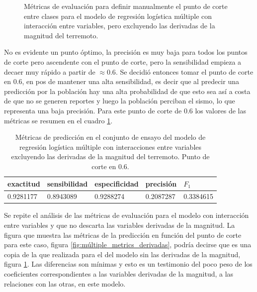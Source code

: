 \documentclass[a4paper]{report}
\begin{document}
\begin{figure}[!ht]
	\centering
	
	\vspace{-0.8cm}
	\caption{Métricas de evaluación para definir manualmente el punto de corte entre clases para el modelo de regresión logística múltiple con interacción entre variables, pero excluyendo las derivadas de la magnitud del terremoto.
	}
	\label{fig:múltiple_metrics}
\end{figure}

No es evidente un punto óptimo, la precisión es muy baja para todos los puntos de corte pero ascendente con el punto de corte, pero la sensibilidad empieza a decaer muy rápido a partir de \(\approx 0.6\).
Se decidió entonces tomar el punto de corte en \num{0.6}, en pos de mantener una alta sensibilidad, es decir que al predecir una predicción por la población hay una alta probabilidad de que esto sea así a costa de que no se generen reportes y luego la población perciban el sismo, lo que representa una baja precisión.
Para este punto de corte de \num{0.6} los valores de las métricas se resumen en el cuadro \ref{tab:múltiple_metrics}.

\begin{table}[!ht]
	\centering
	\begin{tabular}{lllll}
	\toprule
	exactitud & sensibilidad & especificidad & precisión & \(F_1\) \\
	\midrule
	\num{0.9281177} & \num{0.8943089} & \num{0.9288274} & \num{0.2087287} & \num{0.3384615}\\
	\bottomrule
	\end{tabular}
	\caption{Métricas de predicción en el conjunto de ensayo del modelo de regresión logística múltiple con interacciones entre variables excluyendo las derivadas de la magnitud del terremoto. Punto de corte en \num{0.6}.
	}
	\label{tab:múltiple_metrics}
\end{table}

Se repite el análisis de las métricas de evaluación para el modelo con interacción entre variables y que no descarta las variables derivadas de la magnitud.
La figura que muestra las métricas de la predicción en función del punto de corte para este caso, figura \ref{fig:múltiple_metrics_derivadas}, podría decirse que es una copia de la que realizada para el del modelo sin las derivadas de la magnitud, figura \ref{fig:múltiple_metrics}.
Las diferencias son mínimas y esto es un testimonio del poco peso de los coeficientes correspondientes a las variables derivadas de la magnitud, a las relaciones con las otras, en este modelo. 
\end{document}
